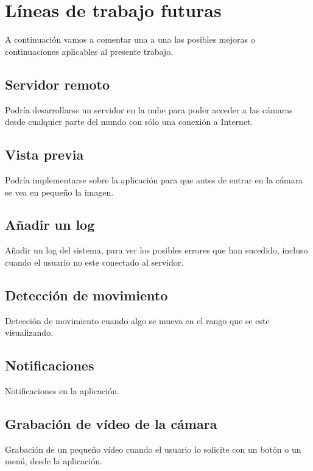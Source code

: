 \section{Líneas de trabajo futuras}

A continuación vamos a comentar una a una las posibles mejoras o continuaciones aplicables al presente trabajo.

\subsection{Servidor remoto}

Podría desarrollarse un servidor en la nube para poder acceder a las cámaras desde cualquier parte del mundo con sólo una conexión a Internet.

\subsection{Vista previa}

Podría implementarse sobre la aplicación para que antes de entrar en la cámara se vea en pequeño la imagen.

\subsection{Añadir un log}

Añadir un log del sistema, para ver los posibles errores que han sucedido, incluso cuando el usuario no este conectado al servidor.

\subsection{Detección de movimiento}

Detección de movimiento cuando algo se mueva en el rango que se este visualizando.

\subsection{Notificaciones}

Notificaciones en la aplicación.

\subsection{Grabación de vídeo de la cámara}

Grabación de un pequeño vídeo cuando el usuario lo solicite con un botón o un menú, desde la aplicación.


